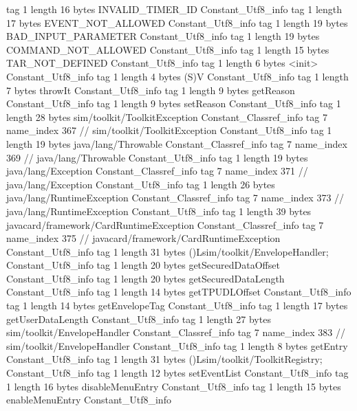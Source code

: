{{{			tag	1
			length	16
			bytes	INVALID_TIMER_ID
		}
		Constant_Utf8_info {
			tag	1
			length	17
			bytes	EVENT_NOT_ALLOWED
		}
		Constant_Utf8_info {
			tag	1
			length	19
			bytes	BAD_INPUT_PARAMETER
		}
		Constant_Utf8_info {
			tag	1
			length	19
			bytes	COMMAND_NOT_ALLOWED
		}
		Constant_Utf8_info {
			tag	1
			length	15
			bytes	TAR_NOT_DEFINED
		}
		Constant_Utf8_info {
			tag	1
			length	6
			bytes	<init>
		}
		Constant_Utf8_info {
			tag	1
			length	4
			bytes	(S)V
		}
		Constant_Utf8_info {
			tag	1
			length	7
			bytes	throwIt
		}
		Constant_Utf8_info {
			tag	1
			length	9
			bytes	getReason
		}
		Constant_Utf8_info {
			tag	1
			length	9
			bytes	setReason
		}
		Constant_Utf8_info {
			tag	1
			length	28
			bytes	sim/toolkit/ToolkitException
		}
		Constant_Classref_info {
			tag	7
			name_index	367		// sim/toolkit/ToolkitException
		}
		Constant_Utf8_info {
			tag	1
			length	19
			bytes	java/lang/Throwable
		}
		Constant_Classref_info {
			tag	7
			name_index	369		// java/lang/Throwable
		}
		Constant_Utf8_info {
			tag	1
			length	19
			bytes	java/lang/Exception
		}
		Constant_Classref_info {
			tag	7
			name_index	371		// java/lang/Exception
		}
		Constant_Utf8_info {
			tag	1
			length	26
			bytes	java/lang/RuntimeException
		}
		Constant_Classref_info {
			tag	7
			name_index	373		// java/lang/RuntimeException
		}
		Constant_Utf8_info {
			tag	1
			length	39
			bytes	javacard/framework/CardRuntimeException
		}
		Constant_Classref_info {
			tag	7
			name_index	375		// javacard/framework/CardRuntimeException
		}
		Constant_Utf8_info {
			tag	1
			length	31
			bytes	()Lsim/toolkit/EnvelopeHandler;
		}
		Constant_Utf8_info {
			tag	1
			length	20
			bytes	getSecuredDataOffset
		}
		Constant_Utf8_info {
			tag	1
			length	20
			bytes	getSecuredDataLength
		}
		Constant_Utf8_info {
			tag	1
			length	14
			bytes	getTPUDLOffset
		}
		Constant_Utf8_info {
			tag	1
			length	14
			bytes	getEnvelopeTag
		}
		Constant_Utf8_info {
			tag	1
			length	17
			bytes	getUserDataLength
		}
		Constant_Utf8_info {
			tag	1
			length	27
			bytes	sim/toolkit/EnvelopeHandler
		}
		Constant_Classref_info {
			tag	7
			name_index	383		// sim/toolkit/EnvelopeHandler
		}
		Constant_Utf8_info {
			tag	1
			length	8
			bytes	getEntry
		}
		Constant_Utf8_info {
			tag	1
			length	31
			bytes	()Lsim/toolkit/ToolkitRegistry;
		}
		Constant_Utf8_info {
			tag	1
			length	12
			bytes	setEventList
		}
		Constant_Utf8_info {
			tag	1
			length	16
			bytes	disableMenuEntry
		}
		Constant_Utf8_info {
			tag	1
			length	15
			bytes	enableMenuEntry
		}
		Constant_Utf8_info {
}}}
